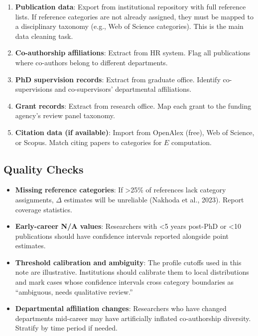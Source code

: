 \documentclass[
]{article}
\providecommand{\tightlist}{%
  \setlength{\itemsep}{0pt}\setlength{\parskip}{0pt}}
\begin{document}
\begin{enumerate}
\def\labelenumi{\arabic{enumi}.}
\item
  \textbf{Publication data}: Export from institutional repository with
  full reference lists. If reference categories are not already
  assigned, they must be mapped to a disciplinary taxonomy (e.g., Web of
  Science categories). This is the main data cleaning task.
\item
  \textbf{Co-authorship affiliations}: Extract from HR system. Flag all
  publications where co-authors belong to different departments.
\item
  \textbf{PhD supervision records}: Extract from graduate office.
  Identify co-supervisions and co-supervisors' departmental
  affiliations.
\item
  \textbf{Grant records}: Extract from research office. Map each grant
  to the funding agency's review panel taxonomy.
\item
  \textbf{Citation data (if available)}: Import from OpenAlex (free),
  Web of Science, or Scopus. Match citing papers to categories for \(E\)
  computation.
\end{enumerate}

\hypertarget{quality-checks}{%
\subsection{Quality Checks}\label{quality-checks}}

\begin{itemize}
\tightlist
\item
  \textbf{Missing reference categories}: If \textgreater25\% of
  references lack category assignments, \(\Delta\) estimates will be
  unreliable (Nakhoda et al., 2023). Report coverage statistics.
\item
  \textbf{Early-career N/A values}: Researchers with \textless5 years
  post-PhD or \textless10 publications should have confidence intervals
  reported alongside point estimates.
\item
  \textbf{Threshold calibration and ambiguity}: The profile cutoffs used
  in this note are illustrative. Institutions should calibrate them to
  local distributions and mark cases whose confidence intervals cross
  category boundaries as ``ambiguous, needs qualitative review.''
\item
  \textbf{Departmental affiliation changes}: Researchers who have
  changed departments mid-career may have artificially inflated
  co-authorship diversity. Stratify by time period if needed.
\end{itemize}
\end{document}
